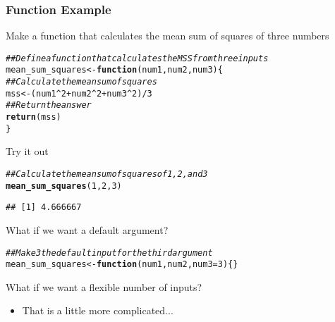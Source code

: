 \documentclass{beamer}\usepackage[]{graphicx}\usepackage[]{color}
\makeatletter
\newcommand{\hlnum}[1]{\textcolor[rgb]{0.686,0.059,0.569}{#1}}%
\newcommand{\hlcom}[1]{\textcolor[rgb]{0.678,0.584,0.686}{\textit{#1}}}%
\newcommand{\hlopt}[1]{\textcolor[rgb]{0,0,0}{#1}}%
\newcommand{\hlstd}[1]{\textcolor[rgb]{0.345,0.345,0.345}{#1}}%
\newcommand{\hlkwa}[1]{\textcolor[rgb]{0.161,0.373,0.58}{\textbf{#1}}}%
\newcommand{\hlkwb}[1]{\textcolor[rgb]{0.69,0.353,0.396}{#1}}%
\newcommand{\hlkwc}[1]{\textcolor[rgb]{0.333,0.667,0.333}{#1}}%
\newcommand{\hlkwd}[1]{\textcolor[rgb]{0.737,0.353,0.396}{\textbf{#1}}}%
\newenvironment{kframe}{%
 \def\at@end@of@kframe{}%
 \ifinner\ifhmode%
  \def\at@end@of@kframe{\end{minipage}}%
  \begin{minipage}{\columnwidth}%
 \fi\fi%
 \def\FrameCommand##1{\hskip\@totalleftmargin \hskip-\fboxsep
 \colorbox{shadecolor}{##1}\hskip-\fboxsep
     \hskip-\linewidth \hskip-\@totalleftmargin \hskip\columnwidth}%
 \MakeFramed {\advance\hsize-\width
   \@totalleftmargin\z@ \linewidth\hsize
   \@setminipage}}%
 {\par\unskip\endMakeFramed%
 \at@end@of@kframe}
\newenvironment{knitrout}{}{} %
\makeatother
\begin{document}
\begin{frame}[fragile]\frametitle{Function Example}
    Make a function that calculates the mean sum of squares of three numbers \\
\begin{knitrout}\footnotesize
{}\color{fgcolor}\begin{kframe}
\begin{alltt}
\hlcom{## Define a function that calculates the MSS from three inputs}
\hlstd{mean_sum_squares} \hlkwb{<-} \hlkwa{function}\hlstd{(}\hlkwc{num1}\hlstd{,} \hlkwc{num2}\hlstd{,} \hlkwc{num3}\hlstd{)\{}
  \hlcom{## Calculate the mean sum of squares}
  \hlstd{mss} \hlkwb{<-} \hlstd{(num1}\hlopt{^}\hlnum{2} \hlopt{+} \hlstd{num2}\hlopt{^}\hlnum{2} \hlopt{+} \hlstd{num3}\hlopt{^}\hlnum{2}\hlstd{)} \hlopt{/} \hlnum{3}
  \hlcom{## Return the answer}
  \hlkwd{return}\hlstd{(mss)}
\hlstd{\}}
\end{alltt}
\end{kframe}
\end{knitrout}
    \vspace{1ex}
    Try it out
\begin{knitrout}\footnotesize
{}\color{fgcolor}\begin{kframe}
\begin{alltt}
\hlcom{## Calculate the mean sum of squares of 1, 2, and 3}
\hlkwd{mean_sum_squares}\hlstd{(}\hlnum{1}\hlstd{,} \hlnum{2}\hlstd{,} \hlnum{3}\hlstd{)}
\end{alltt}
\begin{verbatim}
## [1] 4.666667
\end{verbatim}
\end{kframe}
\end{knitrout}
    \vspace{1ex}
    What if we want a default argument?
\begin{knitrout}\footnotesize
{}\color{fgcolor}\begin{kframe}
\begin{alltt}
\hlcom{## Make 3 the default input for the third argument}
\hlstd{mean_sum_squares} \hlkwb{<-} \hlkwa{function}\hlstd{(}\hlkwc{num1}\hlstd{,} \hlkwc{num2}\hlstd{,} \hlkwc{num3} \hlstd{=} \hlnum{3}\hlstd{)\{\}}
\end{alltt}
\end{kframe}
\end{knitrout}
    \vspace{1ex}
    What if we want a flexible number of inputs?
    \begin{itemize}
        \item That is a little more complicated...
    \end{itemize}
\end{frame}
\end{document}
